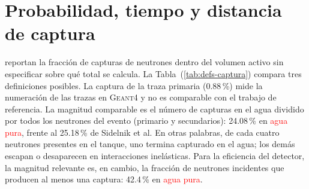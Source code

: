 \section{Probabilidad, tiempo y distancia de captura}
\label{subsubsec:captura}

\citet[Sec.~3, Tabla~2, p.~2218]{Sidelnik2020} reportan la fracción de capturas de neutrones dentro del volumen activo sin especificar sobre qué total se calcula. La Tabla~(\ref{tab:defs-captura}) compara tres definiciones posibles. La captura de la traza primaria (0.88\,\%) mide la numeración de las trazas en \textsc{Geant4} y no es comparable con el trabajo de referencia. La magnitud comparable es el número de capturas en el agua dividido por todos los neutrones del evento (primario y secundarios): 24.08\,\% en \textcolor{red}{agua pura}, frente al 25.18\,\% de Sidelnik et al. En otras palabras, de cada cuatro neutrones presentes en el tanque, uno termina capturado en el agua; los demás escapan o desaparecen en interacciones inelásticas. Para la eficiencia del detector, la magnitud relevante es, en cambio, la fracción de neutrones incidentes que producen al menos una captura: 42.4\,\% en \textcolor{red}{agua pura}.

